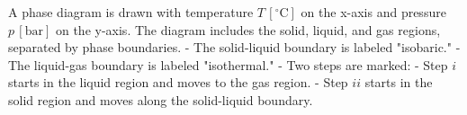 A phase diagram is drawn with temperature \( T \, [^\circ\text{C}] \) on the x-axis and pressure \( p \, [\text{bar}] \) on the y-axis. The diagram includes the solid, liquid, and gas regions, separated by phase boundaries.  
- The solid-liquid boundary is labeled "isobaric."  
- The liquid-gas boundary is labeled "isothermal."  
- Two steps are marked:  
  - Step \( i \) starts in the liquid region and moves to the gas region.  
  - Step \( ii \) starts in the solid region and moves along the solid-liquid boundary.